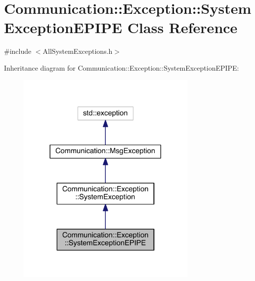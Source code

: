 \hypertarget{class_communication_1_1_exception_1_1_system_exception_e_p_i_p_e}{}\section{Communication\+:\+:Exception\+:\+:System\+Exception\+E\+P\+I\+P\+E Class Reference}
\label{class_communication_1_1_exception_1_1_system_exception_e_p_i_p_e}


{\ttfamily \#include $<$All\+System\+Exceptions.\+h$>$}



Inheritance diagram for Communication\+:\+:Exception\+:\+:System\+Exception\+E\+P\+I\+P\+E\+:\nopagebreak
\begin{figure}[H]
\begin{center}
\leavevmode
\includegraphics[width=248pt]{class_communication_1_1_exception_1_1_system_exception_e_p_i_p_e__inherit__graph}
\end{center}
\end{figure}


